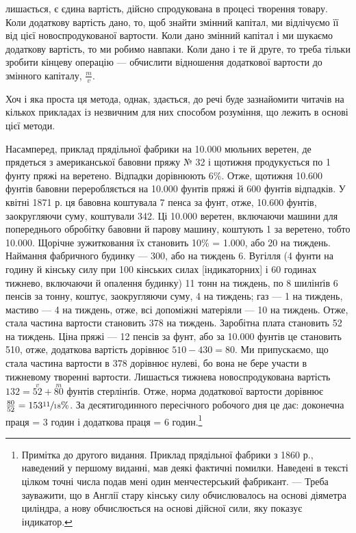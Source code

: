\parcont{}  %
лишається, є єдина вартість, дійсно спродукована в процесі творення товару. Коли додаткову вартість
дано, то, щоб знайти змінний капітал, ми відлічуємо її від цієї новоспродукованої вартости.
Коли дано змінний капітал і ми шукаємо додаткову вартість, то ми робимо навпаки. Коли дано і те й
друге, то треба тільки зробити кінцеву операцію — обчислити відношення додаткової вартости до
змінного капіталу, $\frac{m}{v}$.

Хоч і яка проста ця метода, однак, здається, до речі буде зазнайомити читачів на кількох прикладах
із незвичним для них
способом розуміння, що лежить в основі цієї методи.

Насамперед, приклад прядільної фабрики на 10.000 мюльних веретен, де прядеться з американської
бавовни пряжу № 32 і
щотижня продукується по 1 фунту пряжі на веретено. Відпадки дорівнюють 6\%. Отже, щотижня 10.600
фунтів бавовни переробляється на 10.000 фунтів пряжі й 600 фунтів відпадків. У квітні 1871 р. ця
бавовна коштувала 7 пенса за фунт, отже, 10.600 фунтів, заокругляючи суму, коштували 342. Ці 10.000
веретен, включаючи машини для попереднього обробітку бавовни й парову машину, коштують 1 за веретено, тобто 10.000. Щорічне зужитковання їх становить
10\% = 1.000, або 20 на тиждень. Наймання фабричного будинку —
300, або на тиждень 6. Вугілля (4 фунти на годину
й кінську силу при 100 кінських силах [індикаторних] і 60 годинах тижнево, включаючи й опалення
будинку) 11 тонн
на тиждень, по 8 шилінґів 6 пенсів за тонну, коштує, заокругляючи суму, 4 на
тиждень; газ — 1 на тиждень, мастиво — 4 на тиждень, отже, всі
допоміжні матеріяли — 10 на тиждень. Отже, стала частина вартости становить 378
на тиждень. Заробітна плата становить 52 на тиждень. Ціна пряжі — 12 пенсів за
фунт, або за 10.000 фунтів
це становить 510, отже, додаткова вартість дорівнює $510 - 430 = 80$. Ми припускаємо, що стала частина вартости в 378 дорівнює нулеві, бо
вона не бере участи в тижневому творенні вартости.
Лишається тижнева новоспродукована вартість $132 = \overset{v}{52} + \overset{m}{80}$ фунтів стерлінґів. Отже, норма
додаткової вартости дорівнює
$\frac{80}{52} = 153\sfrac{11}{18}\%$. За десятигодинного пересічного робочого дня це дає: доконечна праця = 3
годин і додаткова праця = 6 годин.\footnote{
Примітка до другого видання. Приклад прядільної фабрики з 1860 р., наведений у першому виданні,
мав деякі фактичні помилки. Наведені в тексті цілком точні числа подав мені один менчестерський
фабрикант. — Треба зауважити, що в Англії стару кінську силу обчислювалось
на основі діяметра циліндра, а нову обчислюється на основі дійсної сили, яку показує індикатор.
}
